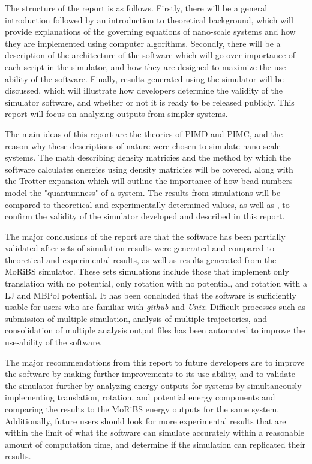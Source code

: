 \documentclass{ece}
\begin{document}
The structure of the report is as follows. Firstly, there will be a general introduction followed by an introduction to theoretical background, which will provide explanations of the governing equations of nano-scale systems and how they are implemented using computer algorithms. Secondly, there will be a description of the architecture of the software which will go over importance of each script in the simulator, and how they are designed to maximize the use-ability of the software. Finally, results generated using the simulator will be discussed, which will illustrate how developers determine the validity of the simulator software, and whether or not it is ready to be released publicly. This report will focus on analyzing outputs from simpler systems. 

The main ideas of this report are the theories of \gls{PIMD} and \gls{PIMC}, and the reason why these descriptions of nature were chosen to simulate nano-scale systems. The math describing density matricies and the method by which the software calculates energies using density matricies will be covered, along with the Trotter expansion which will outline the importance of how bead numbers model the "quantumness" of a system. The results from simulations will be compared to theoretical and experimentally determined values, as well as , to confirm the validity of the simulator developed and described in this report. 

The major conclusions of the report are that the software has been partially validated after sets of simulation results were generated and compared to theoretical and experimental results, as well as results generated from the \gls{MoRiBS} simulator. These sets simulations include those that implement only translation with no potential, only rotation with no potential, and rotation with a \gls{LJ} and \gls{MBPol} potential. It has been concluded that the software is sufficiently usable for users who are familiar with \textit{github} and \textit{Unix}. Difficult processes such as submission of multiple simulation, analysis of multiple trajectories, and consolidation of multiple analysis output files has been automated to improve the use-ability of the software.

The major recommendations from this report to future developers are to improve the software by making further improvements to its use-ability, and to validate the simulator further by analyzing energy outputs for systems by simultaneously implementing translation, rotation, and potential energy components and comparing the results to the \gls{MoRiBS} energy outputs for the same system. Additionally, future users should look for more experimental results that are within the limit of what the software can simulate accurately within a reasonable amount of computation time, and determine if the simulation can replicated their results.
\end{document}
